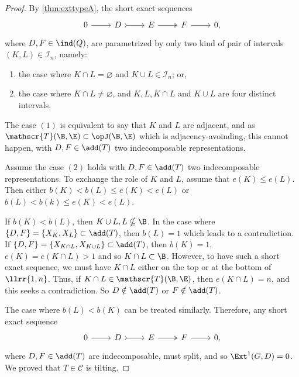 \begin{proof}
    By \cref{thm:exttypeA}, the short exact sequences
    \[\begin{tikzcd}
	0 & D & E  & F &  0,
	\arrow[from=1-1, to=1-2]
	\arrow[tail, from=1-2, to=1-3]
	\arrow[two heads,from=1-3, to=1-4]
	\arrow[from=1-4, to=1-5]
\end{tikzcd}\] where $D,F \in  \ind(Q)$, are parametrized by only two kind of pair of intervals $(K,L) \in \mathcal{I}_n$, namely:
    \begin{enumerate}[label=$(\arabic*)$,itemsep=1mm]
        \item the case where $K \cap L = \varnothing$ and $K \cup L \in \mathcal{I}_n$; or,

        \item the case where $K \cap L \neq \varnothing$, and $K,L,K\cap L$ and $K \cup L$ are four distinct intervals.
    \end{enumerate}
        The case $(1)$ is equivalent to say that $K$ and $L$ are adjacent, and as $\mathscr{T}(\B,\E) \subset \opJ(\B,\E)$ which is adjacency-avoinding, this cannot happen, with $D,F \in \add(T)$ two indecomposable representations.
        
        Assume the case $(2)$ holds with $D,F \in \add(T)$ two indecomposable representations. To exchange the role of $K$ and $L$, assume that $e(K) \leqslant e(L)$. Then either $b(K) < b(L) \leqslant e(K) < e(L)$ or $b(L) < b(k) \leqslant e(K) < e(L)$. 
        
        If $b(K) < b(L)$, then $K \cup L, L \nsubseteq \B$. In the case where $\{D,F\} = \{X_K, X_L\} \subset \add(T)$, then $b(L) = 1$ which leads to a contradiction. If $\{D,F\} = \{X_{K \cap L}, X_{K \cup L}\} \subset \add(T)$, then $b(K)=1$, $e(K) = e(K \cap L) > 1$ and so $K \cap L \subset \B$. However, to have such a short exact sequence, we must have $K \cap L$ either on the top or at the bottom of $\llrr{1,n}$. Thus, if $K \cap L \in \mathscr{T}(\B,\E)$, then $e(K \cap L) = n$, and this seeks a contradiction. So $D \notin \add(T)$ or $F \notin \add(T)$.

        The case where $b(L) < b(K)$ can be treated similarly.
        Therefore, any short exact sequence  \[\begin{tikzcd}
	0 & D & E  & F &  0,
	\arrow[from=1-1, to=1-2]
	\arrow[tail, from=1-2, to=1-3]
	\arrow[two heads,from=1-3, to=1-4]
	\arrow[from=1-4, to=1-5]
\end{tikzcd}\] where $D,F \in \add(T)$ are indecomposable, must split, and so $\Ext^1(G, D) = 0$. We proved that $T \in \mathscr{C}$ is tilting.
\end{proof}

